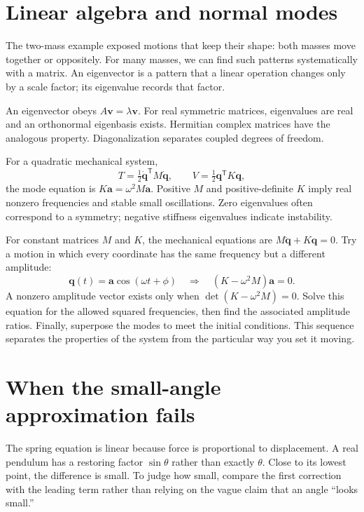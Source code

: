 \documentclass[11pt,oneside]{book}
\newcommand{\vect}[1]{\boldsymbol{#1}}
\theoremstyle{reviewstyle}
\begin{document}
\section{Linear algebra and normal modes}
The two-mass example exposed motions that keep their shape: both masses move together or oppositely. For many masses, we can find such patterns systematically with a matrix. An eigenvector is a pattern that a linear operation changes only by a scale factor; its eigenvalue records that factor.

An eigenvector obeys $A\vect v=\lambda\vect v$. For real symmetric matrices, eigenvalues are real and an orthonormal eigenbasis exists. Hermitian complex matrices have the analogous property. Diagonalization separates coupled degrees of freedom.

For a quadratic mechanical system,
\begin{equation}
T=\tfrac12\dot{\vect q}^{\mathsf T}M\dot{\vect q},\qquad
V=\tfrac12\vect q^{\mathsf T}K\vect q,
\end{equation}
the mode equation is $K\vect a=\omega^2M\vect a$. Positive $M$ and positive-definite $K$ imply real nonzero frequencies and stable small oscillations. Zero eigenvalues often correspond to a symmetry; negative stiffness eigenvalues indicate instability.

For constant matrices $M$ and $K$, the mechanical equations are $M\ddot{\vect q}+K\vect q=0$. Try a motion in which every coordinate has the same frequency but a different amplitude:
\begin{equation}
\vect q(t)=\vect a\cos(\omega t+\phi)
\quad\Longrightarrow\quad
(K-\omega^2M)\vect a=0.
\end{equation}
A nonzero amplitude vector exists only when $\det(K-\omega^2M)=0$. Solve this equation for the allowed squared frequencies, then find the associated amplitude ratios. Finally, superpose the modes to meet the initial conditions. This sequence separates the properties of the system from the particular way you set it moving.

\section{When the small-angle approximation fails}
The spring equation is linear because force is proportional to displacement. A real pendulum has a restoring factor $\sin\theta$ rather than exactly $\theta$. Close to its lowest point, the difference is small. To judge how small, compare the first correction with the leading term rather than relying on the vague claim that an angle ``looks small.''
\end{document}
